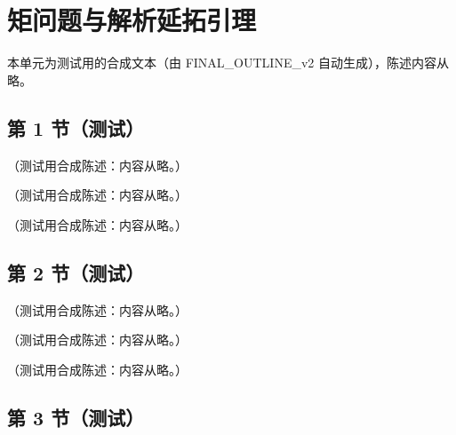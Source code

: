 \chapter{矩问题与解析延拓引理}\label{app:appK}
本单元为测试用的合成文本（由 FINAL\_OUTLINE\_v2 自动生成），陈述内容从略。

\section{第 1 节（测试）}\label{sec:appK-hausdorff}

\begin{lemma}\label{lem:appK-hausdorff}
（测试用合成陈述：内容从略。）
\end{lemma}

\begin{theorem}[偶数矩决定函数]\label{thm:appK-even-moments}
（测试用合成陈述：内容从略。）
\end{theorem}

\begin{corollary}\label{cor:appK-pdf}
（测试用合成陈述：内容从略。）
\end{corollary}

\section{第 2 节（测试）}\label{sec:appK-continuation}

\begin{proposition}[领头阶核由偶数矩唯一确定]\label{prop:appK-kernels}
（测试用合成陈述：内容从略。）
\end{proposition}

\begin{theorem}[Carlson 定理]\label{thm:appK-carlson}
（测试用合成陈述：内容从略。）
\end{theorem}

\begin{proposition}[多项式有界条件下延拓的唯一性]\label{prop:appK-continuation}
（测试用合成陈述：内容从略。）
\end{proposition}

\section{第 3 节（测试）}\label{sec:appK-entire}

